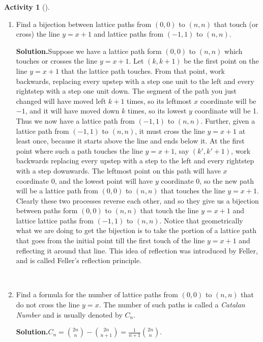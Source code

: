 \documentclass[10pt,]{book}
\theoremstyle{plain}
\theoremstyle{definition}
\newtheorem{activity}[project]{Activity}
\numberwithin{equation}{chapter}
\begin{document}
\begin{activity}[]
\begin{enumerate}[label=(\alph*)]
~\par
\item Find a bijection between lattice paths from \((0,0)\) to \((n,n)\) that touch (or cross) the line \(y=x+1\) and lattice paths from \((-1,1)\) to \((n,n)\).%
\par\medskip\noindent%
\textbf{Solution.}\quad Suppose we have a lattice path form \((0,0)\) to \((n,n)\) which touches or crosses the line \(y=x+1\). Let \((k,k+1)\) be the first point on the line \(y=x+1\) that the lattice path touches. From that point, work backwards, replacing every upstep with a step one unit to the left and every rightstep with a step one unit down. The segment of the path you just changed will have moved left \(k+1\) times, so its leftmost \(x\) coordinate will be \(-1\), and it will have moved down \(k\) times, so its lowest \(y\) coordinate will be 1.  Thus we now have a lattice path from \((-1,1)\) to \((n,n)\). Further, given a lattice path from \((-1,1)\) to \((n,n)\), it must cross the line \(y=x+1\) at least once, because it starts above the line and ends below it. At the first point where such a path touches the line \(y=x+1\), say \((k',k'+1)\), work backwards replacing every upstep with a step to the left and every rightstep with a step downwards. The leftmost point on this path will have \(x\) coordinate 0, and the lowest point will have \(y\) coordinate 0, so the new path will be a lattice path from \((0,0)\) to \((n,n)\) that touches the line \(y=x+1\). Clearly these two processes reverse each other, and so they give us a bijection between paths form \((0,0)\) to \((n,n)\) that touch the line \(y=x+1\) and lattice lattice paths from \((-1,1)\) to \((n,n)\). Notice that geometrically what we are doing to get the bijection is to take the portion of a lattice path that goes from the initial point till the first touch of the line \(y=x+1\) and reflecting it around that line. This idea of reflection was introduced by Feller, and is called Feller's reflection principle.%

~\par
\item Find a formula for the number of lattice paths from \((0,0)\) to \((n,n)\) that do not cross the line \(y=x\).  The number of such paths is called a \emph{Catalan Number} and is usually denoted by \(C_n\).%
\par\medskip\noindent%
\textbf{Solution.}\quad \(C_n=\binom{2n}{n} - \binom{2n}{n+1}=\frac{1}{n+1}\binom{2n}{n}.\)%

\end{enumerate}
\end{activity}
\end{document}
